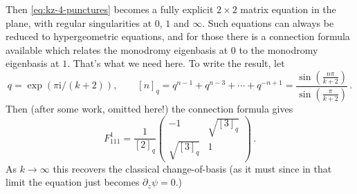 \documentclass[12pt,letterpaper,reqno]{amsart}
\numberwithin{equation}{section}
\newcommand{\I}{{\mathrm i}}
\newcommand{\eps}{\epsilon}
\DeclareRobustCommand{\fixme}[1]{\leavevmode{\color{orange}[#1]}}
\begin{document}
\begin{example}
Then \eqref{eq:kz-4-punctures} becomes a fully explicit $2 \times 2$
matrix equation in the plane, with regular singularities at $0$, $1$
and $\infty$. Such equations can always be reduced to hypergeometric
equations, and for those there is a connection formula available which
relates the monodromy eigenbasis at $0$ to the monodromy eigenbasis 
at $1$. That's what we need here.
To write the result, let
\begin{equation}
  q = \exp(\pi \I / (k+2)), \qquad [n]_q = q^{n-1} + q^{n-3} + \cdots + q^{-n+1} = \frac{\sin(\frac{n\pi}{k+2})}{\sin(\frac{\pi}{k+2})} \, .
\end{equation}
Then (after some work, omitted here!) the connection formula gives
\begin{equation}
  F_{111}^1 = \frac{1}{[2]_q} \begin{pmatrix} -1 & \sqrt{[3]_q} \\ \sqrt{[3]_q} & 1 \end{pmatrix} \, .
\end{equation}
As $k \to \infty$ this recovers the classical change-of-basis
(as it must since in that limit the equation just becomes
$\partial_z \psi = 0$.)




\end{example}
\end{document}
